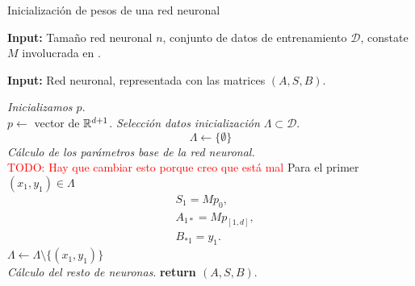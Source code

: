 \begin{algorithm}[H]
    \caption{Inicialización de pesos de una red neuronal}
    \textbf{Input:} Tamaño red neuronal $n$, conjunto de datos de entrenamiento $\mathcal{D}$, constate $M$ involucrada en .

    \textbf{Input:} Red neuronal, representada con las matrices $(A,S,B)$.
    \hspace*{\algorithmicindent} 
    \begin{algorithmic}[1]
       \STATE \textit{Inicializamos $p$}. \\
       $p \gets$ vector de $\mathbb{R}^{d+1}$. 
       \STATE \textit{Selección datos inicialización
       $\Lambda \subset \mathcal{D}$}. \\
       \begin{equation}
           \Lambda \gets \{ \emptyset \}
       \end{equation}
       \STATE \textit{Cálculo de los parámetros base de la red neuronal.} \\
       \textcolor{red}{ TODO: Hay que cambiar esto porque creo que está mal}
       Para el primer $(x_1, y_1) \in \Lambda$ \\
       \begin{align}
            &S_1 = M p_0, \\
            & A_{1 *} = M p_{[1,d]}, \\
            & B_{* 1} = y_1.
        \end{align}
       $\Lambda \gets \Lambda \setminus \{(x_1, y_1)\} $ \\
       \STATE \textit{Cálculo del resto de neuronas}. 
       \STATE \textbf{return $(A,S,B)$}.
    \end{algorithmic}  
\end{algorithm}
